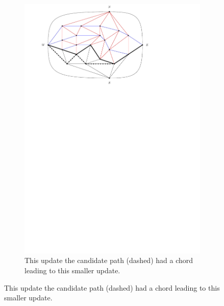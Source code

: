 \begin{figure}
    \centering
    \ContinuedFloat
    \begin{subfigure}[b]{.9 \textwidth}
      \includegraphics[width=\textwidth]{examples/img/smallExample/smallExample-5}
      \caption{This update the candidate path (dashed) had a chord leading to this smaller update.}
      \label{fig:ex:simple:5}
    \end{subfigure}


\end{figure}
